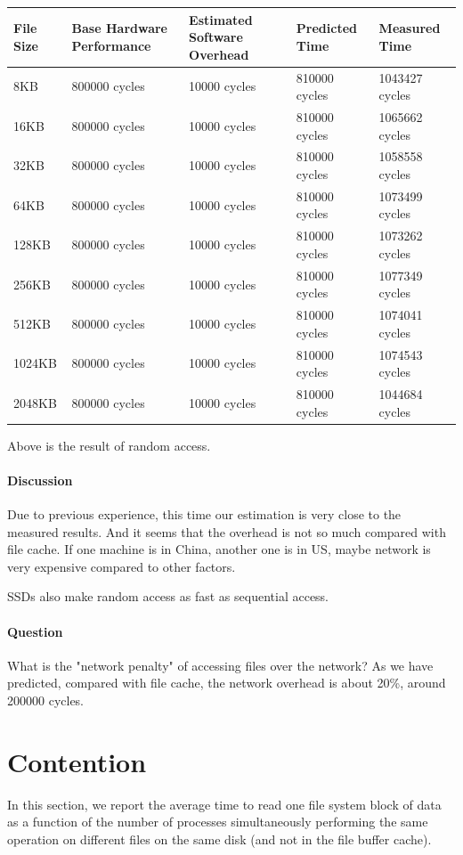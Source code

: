 \begin{center}
\begin{tabular}{| p{4cm} | p{2.5cm} | p{2.5cm} | p{2.5cm} | p{2.5cm} |}
File Size  & Base Hardware Performance  & Estimated Software Overhead  & Predicted Time  & Measured Time   \\
\hline
8KB & 800000 cycles& 10000 cycles& 810000 cycles& 1043427 cycles\\ 
16KB & 800000 cycles& 10000 cycles& 810000 cycles& 1065662 cycles\\ 
32KB & 800000 cycles& 10000 cycles& 810000 cycles& 1058558 cycles\\
64KB & 800000 cycles& 10000 cycles& 810000 cycles& 1073499 cycles\\
128KB & 800000 cycles& 10000 cycles& 810000 cycles& 1073262 cycles\\
256KB & 800000 cycles& 10000 cycles& 810000 cycles& 1077349 cycles\\
512KB & 800000 cycles& 10000 cycles& 810000 cycles& 1074041 cycles\\
1024KB & 800000 cycles& 10000 cycles& 810000 cycles& 1074543 cycles\\
2048KB & 800000 cycles& 10000 cycles& 810000 cycles& 1044684 cycles\\

\end{tabular}
\end{center}

Above is the result of random access.

\paragraph{Discussion}
Due to previous experience, this time our estimation is very close to the measured results. And it seems that the overhead is not so much compared with file cache. If one machine is in China, another one is in US, maybe network is very expensive compared to other factors.

SSDs also make random access as fast as sequential access.

\paragraph{Question} What is the "network penalty" of accessing files over the network?  As we have predicted, compared with file cache, the network overhead is about 20\%, around 200000 cycles.

\section{Contention}
In this section, we report the average time to read one file system block of data as a function of the number of processes simultaneously performing the same operation on different files on the same disk (and not in the file buffer cache).

